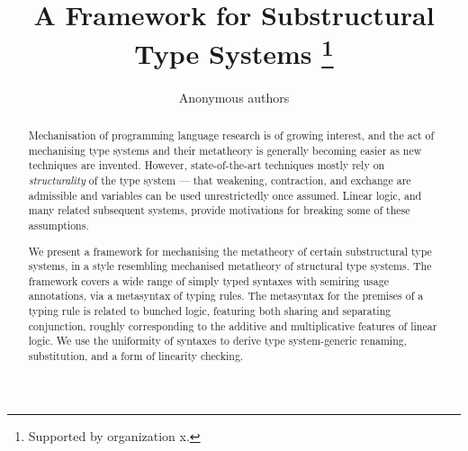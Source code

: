 \documentclass[runningheads]{llncs}
\begin{document}
%
\title{A Framework for Substructural Type Systems
  \thanks{Supported by organization x.}}
%
%
\author{Anonymous authors}
%
%
%
\maketitle              %
%
\begin{abstract}
  Mechanisation of programming language research is of growing interest, and
  the act of mechanising type systems and their metatheory is generally becoming
  easier as new techniques are invented.
  However, state-of-the-art techniques mostly rely on \emph{structurality} of
  the type system --- that weakening, contraction, and exchange are admissible
  and variables can be used unrestrictedly once assumed.
  Linear logic, and many related subsequent systems, provide motivations for
  breaking some of these assumptions.

  We present a framework for mechanising the metatheory of certain
  substructural type systems, in a style resembling mechanised metatheory of
  structural type systems.
  The framework covers a wide range of simply typed syntaxes with semiring
  usage annotations, via a metasyntax of typing rules.
  The metasyntax for the premises of a typing rule is related to bunched logic,
  featuring both sharing and separating conjunction, roughly corresponding to
  the additive and multiplicative features of linear logic.
  We use the uniformity of syntaxes to derive type system-generic renaming,
  substitution, and a form of linearity checking.

\end{abstract}
\end{document}
